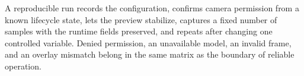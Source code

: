 A reproducible run records the configuration, confirms camera permission from a known lifecycle state,
lets the preview stabilize, captures a fixed number of samples with the runtime fields preserved, and
repeats after changing one controlled variable. Denied permission, an unavailable model, an invalid
frame, and an overlay mismatch belong in the same matrix as the boundary of reliable operation.
\label{end:integration}\label{end:implementation}
\par\endgroup
